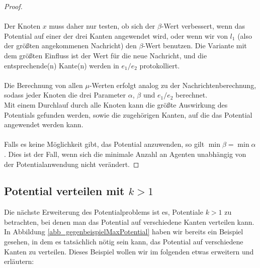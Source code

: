 \begin{proof}
		\\
		\\
		Der Knoten $x$ muss daher nur testen, ob sich der $\beta$-Wert verbessert, wenn das Potential auf einer der drei Kanten angewendet wird, oder wenn wir von $l_{1}$ (also der größten angekommenen Nachricht) den $\beta$-Wert benutzen. Die Variante mit dem größten Einfluss ist der Wert für die neue Nachricht, und die entsprechende(n) Kante(n) werden in $e_1/e_2$ protokolliert.
		\\
		\\
		Die Berechnung von allen $\mu$-Werten erfolgt analog zu der Nachrichtenberechnung, sodass jeder Knoten die drei Parameter $\alpha$, $\beta$ und $e_1/e_2$ berechnet. \\
		Mit einem Durchlauf durch alle Knoten kann die größte Auswirkung des Potentials gefunden werden, sowie die zugehörigen Kanten, auf die das Potential angewendet werden kann.
		\\
		\\
		Falls es keine Möglichkeit gibt, das Potential anzuwenden, so gilt $\min \beta = \min \alpha$. Dies ist der Fall, wenn sich die minimale Anzahl an Agenten unabhängig von der Potentialanwendung nicht verändert.
	\end{proof}
	
	

\subsection{Potential verteilen mit $k > 1$}

Die nächste Erweiterung des Potentialproblems ist es, Potentiale $k > 1$ zu betrachten, bei denen man das Potential auf verschiedene Kanten verteilen kann.\\
In Abbildung \ref{abb_gegenbeispielMaxPotential} haben wir bereits ein Beispiel gesehen, in dem es tatsächlich nötig sein kann, das Potential auf verschiedene Kanten zu verteilen. Dieses Beispiel wollen wir im folgenden etwas erweitern und erläutern:

